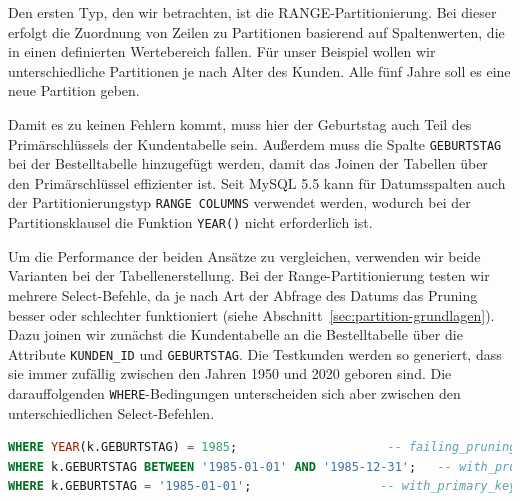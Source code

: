 Den ersten Typ, den wir betrachten, ist die RANGE-Partitionierung.
Bei dieser erfolgt die Zuordnung von Zeilen zu Partitionen basierend auf Spaltenwerten, die in einen definierten Wertebereich fallen.
Für unser Beispiel wollen wir unterschiedliche Partitionen je nach Alter des Kunden.
Alle fünf Jahre soll es eine neue Partition geben.

\vspace{-8pt}

\vspace{-5pt}

Damit es zu keinen Fehlern kommt, muss hier der Geburtstag auch Teil des Primärschlüssels der Kundentabelle sein.
Außerdem muss die Spalte \texttt{GEBURTSTAG} bei der Bestelltabelle hinzugefügt werden, damit das Joinen der Tabellen über den Primärschlüssel effizienter ist.
Seit MySQL 5.5 kann für Datumsspalten auch der Partitionierungstyp \texttt{RANGE COLUMNS} verwendet werden, wodurch bei der Partitionsklausel die Funktion \texttt{YEAR()} nicht erforderlich ist.

Um die Performance der beiden Ansätze zu vergleichen, verwenden wir beide Varianten bei der Tabellenerstellung.
Bei der Range-Partitionierung testen wir mehrere Select-Befehle, da je nach Art der Abfrage des Datums das Pruning besser oder schlechter funktioniert (siehe Abschnitt~\ref{sec:partition-grundlagen}).
Dazu joinen wir zunächst die Kundentabelle an die Bestelltabelle über die Attribute \texttt{KUNDEN\_ID} und \texttt{GEBURTSTAG}.
Die Testkunden werden so generiert, dass sie immer zufällig zwischen den Jahren 1950 und 2020 geboren sind.
Die darauffolgenden \texttt{WHERE}-Bedingungen unterscheiden sich aber zwischen den unterschiedlichen Select-Befehlen.

\vspace{-5pt}
\begin{lstlisting}[language=SQL,caption=Unterschiedliche WHERE-Bedingungen,label={lst:different_where_conditions}]
WHERE YEAR(k.GEBURTSTAG) = 1985;		             -- failing_pruning.sql
WHERE k.GEBURTSTAG BETWEEN '1985-01-01' AND '1985-12-31'; 	-- with_pruning.sql
WHERE k.GEBURTSTAG = '1985-01-01';		            -- with_primary_key.sql
\end{lstlisting}
\vspace{-5pt}

